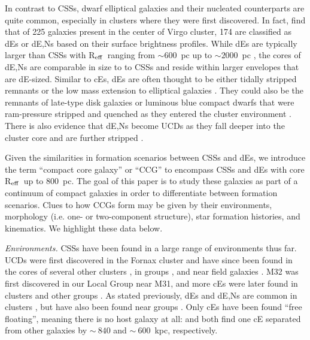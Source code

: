 \documentclass[iop,apj]{emulateapj}
\newcommand{\Reff}{R$_{\rm eff}$}
\begin{document}
In contrast to CSSs, dwarf elliptical galaxies \citep[dEs;][]{Sandage1985} and their nucleated counterparts \citep[dE,Ns;][]{Binggeli1984} are quite common, especially in clusters where they were first discovered. In fact, \citet{Binggeli1991} find that of 225 galaxies present in the center of Virgo cluster, 174 are classified as dEs or dE,Ns based on their surface brightness profiles. While dEs are typically larger than CSSs with \Reff\ ranging from $\sim600$~pc up to $\sim2000$~pc \citep[e.g.,][]{Norris2014}, the cores of dE,Ns are comparable in size to to CSSs and reside within larger envelopes that are dE-sized. Similar to cEs, dEs are often thought to be either tidally stripped remnants \citep{Crnojevic2014} or the low mass extension to elliptical galaxies \citep{Kormendy2012a}. They could also be the remnants of late-type disk galaxies or luminous blue compact dwarfs that were ram-pressure stripped and quenched as they entered the cluster environment \citep{Lisker2013, Crawford2016a}. There is also evidence that dE,Ns become UCDs as they fall deeper into the cluster core and are further stripped \citep{Pfeffer2013,Zhang2015,Liu2015}.

Given the similarities in formation scenarios between CSSs and dEs, we introduce the term ``compact core galaxy'' or ``CCG'' to encompass CSSs and dEs with core \Reff\ up to 800~pc. The goal of this paper is to study these galaxies as part of a continuum of compact galaxies in order to differentiate between formation scenarios. Clues to how CCGs form may be given by their environments,  morphology (i.e. one- or two-component structure), star formation histories, and kinematics. We highlight these data below.

\textit{Environments.} CSSs have been found in a large range of environments thus far. UCDs were first discovered in the Fornax cluster \citep{Hilker1999, Drinkwater2000} and have since been found in the cores of several other clusters \citep{Price2009,Madrid2010,Jones2006,Mieske2009,Misgeld2008}, in groups \citep{Evstigneeva2007}, and near field galaxies \citep{Hau2009,Norris2011}. M32 was first discovered in our Local Group \citep{Faber1973} near M31, and more cEs were later  found in clusters \citep{Chilingarian2007,SmithCastelli2012,Price2009} and other groups \citep{Huxor2011,Chilingarian2010}. As stated previously, dEs and dE,Ns are common in clusters \citep{SmithCastelli2012,Koo1994,Guzman1996,Crawford2016a}, but have also been found near groups \citep{Crnojevic2014,Penny2014}. Only cEs have been found ``free floating'', meaning there is no host galaxy at all: \citet{Huxor2013} and \citet{Paudel2014} both find one cE separated from other galaxies by $\sim~840$ and $\sim~600$~kpc, respectively. 
\end{document}
